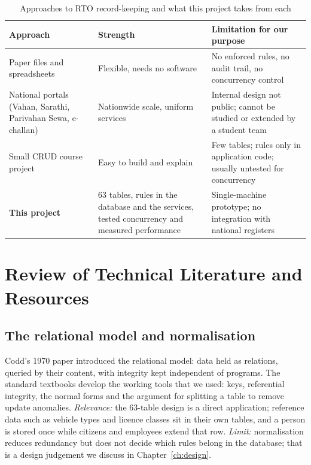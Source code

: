 \begin{table}[H]
\centering\small
\caption{Approaches to RTO record-keeping and what this project takes from each}\label{tab:existing}
\begin{tabularx}{\linewidth}{@{}p{3.2cm}XX@{}}
\toprule
\textbf{Approach} & \textbf{Strength} & \textbf{Limitation for our purpose}\\ \midrule
Paper files and spreadsheets & Flexible, needs no software & No enforced rules, no audit trail, no concurrency control\\
National portals (Vahan, Sarathi, Parivahan Sewa, e-challan) \cite{parivahan-about} & Nationwide scale, uniform services & Internal design not public; cannot be studied or extended by a student team\\
Small CRUD course project & Easy to build and explain & Few tables; rules only in application code; usually untested for concurrency\\
\textbf{This project} & 63 tables, rules in the database and the services, tested concurrency and measured performance & Single-machine prototype; no integration with national registers\\
\bottomrule
\end{tabularx}
\end{table}

\section{Review of Technical Literature and Resources}
\subsection{The relational model and normalisation}
Codd's 1970 paper \cite{codd1970} introduced the relational model: data held as
relations, queried by their content, with integrity kept independent of programs. The
standard textbooks \cite{silberschatz2019,elmasri2016} develop the working tools that
we used: keys, referential integrity, the normal forms and the argument for splitting a
table to remove update anomalies.
\emph{Relevance:} the 63-table design is a direct application; reference data such as
vehicle types and licence classes sit in their own tables, and a person is stored once
while citizens and employees extend that row.
\emph{Limit:} normalisation reduces redundancy but does not decide which rules belong in
the database; that is a design judgement we discuss in Chapter~\ref{ch:design}.

